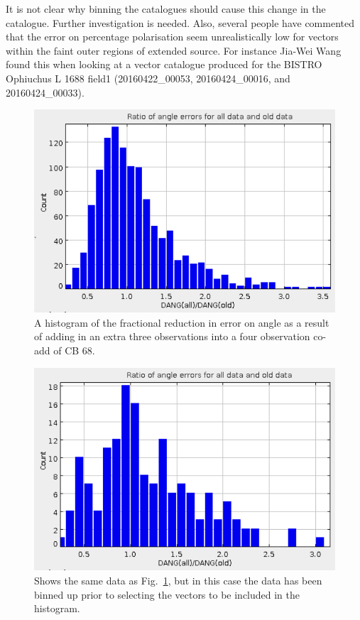 \documentclass[twoside,11pt]{starlink}
\begin{document}
It is not clear why binning the catalogues should cause this change in
the catalogue. Further investigation is needed. Also, several people have
commented that the error on percentage polarisation seem unrealistically
low for vectors within the faint outer regions of extended source. For
instance Jia-Wei Wang found this when looking at a vector catalogue
produced for the BISTRO Ophiuchus L 1688 field1 (20160422\_00053,
20160424\_00016, and 20160424\_00033).

\begin{figure}
\includegraphics[width=\columnwidth]{error1}
\caption{A histogram of the fractional reduction in error on angle
as a result of adding in an extra three observations into a four
observation co-add of CB 68.}
\label{fig:error1}
\end{figure}

\begin{figure}
\includegraphics[width=\columnwidth]{error2}
\caption{Shows the same data as Fig.~\ref{fig:error1}, but in this case
the data has been binned up prior to selecting the vectors to be included
in the histogram.}
\label{fig:error2}
\end{figure}
\end{document}
